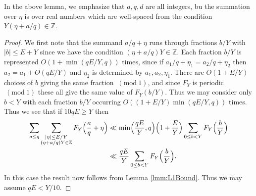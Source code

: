 \documentclass[10pt]{amsart}
\theoremstyle{plain}
\numberwithin{sblmm}{thrm}
\numberwithin{equation}{section}
\newcommand{\Mod}[1]{\ (\mathrm{mod}\ #1)}
\begin{document}
%
%
%
%
In the above lemma, we emphasize that $a,q,d$ are all integers, bu the summation over $\eta$ is over real numbers which are well-spaced from the condition $Y(\eta+a/q)\in\mathbb{Z}$.
%
%
%
%
\begin{proof}
%
We first note that the summand $a/q+\eta$ runs through fractions $b/Y$ with $|b|\le E+Y$ since we have the condition $(\eta+a/q)Y\in\mathbb{Z}$. Each fraction $b/Y$ is represented $O(1+\min(q E/Y,q))$ times, since if $a_1/q+\eta_1=a_2/q+\eta_2$ then $a_2=a_1+O(q E/Y)$ and $\eta_2$ is determined by $a_1,a_2,\eta_1$. There are $O(1+E/Y)$ choices of $b$ giving the same fraction $\Mod{1}$, and since $F_Y$ is periodic $\Mod{1}$ these all give the same value of $F_Y(b/Y)$. Thus we may consider only $b<Y$ with each fraction $b/Y$ occurring $O((1+E/Y)\min(q E/Y,q))$ times. Thus we see that if $10 q E\ge Y$ then
\begin{align*}
\sum_{a\le q}\sum_{\substack{|\eta|\le E/Y\\ (\eta+a/q)Y\in\mathbb{Z}}}F_Y\Bigl(\frac{a}{q}+\eta\Bigr)&\ll \min\Bigl(\frac{q E}{Y},q\Bigr)\Bigl(1+\frac{E}{Y}\Bigr)\sum_{0\le b<Y}F_Y\Big(\frac{b}{Y}\Bigr)\\
&\ll \frac{q E}{Y}\sum_{0\le b<Y}F_Y\Big(\frac{b}{Y}\Bigr).
\end{align*}
In this case the result now follows from Lemma \ref{lmm:L1Bound}. Thus we may assume $q E<Y/10$.


\end{proof}
\end{document}
